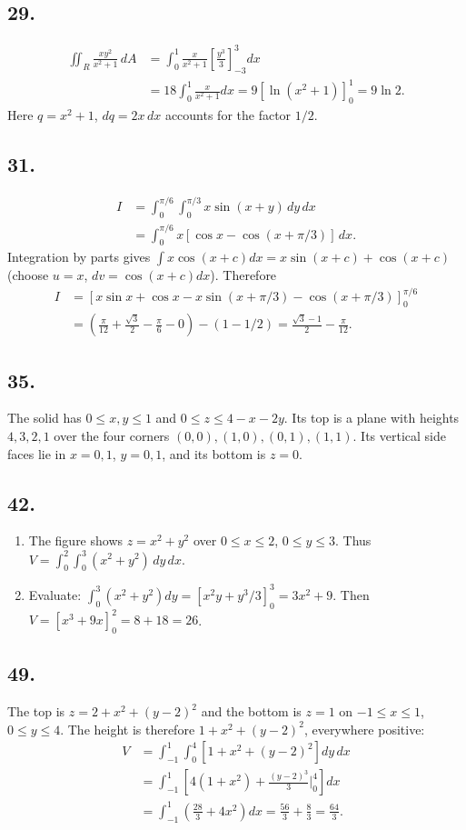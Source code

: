 \documentclass[11pt]{article}
\newcommand{\ex}[1]{\subsection*{#1.}}
\newcommand{\ans}[1]{\boxed{#1}}
\begin{document}
\ex{29}
\begin{align*}
\iint_R\frac{xy^2}{x^2+1}\,dA
&=\int_0^1\frac{x}{x^2+1}\left[\frac{y^3}{3}\right]_{-3}^3dx\\
&=18\int_0^1\frac{x}{x^2+1}dx
=9[\ln(x^2+1)]_0^1=\ans{9\ln2}.
\end{align*}
Here $q=x^2+1$, $dq=2x\,dx$ accounts for the factor $1/2$.
\ex{31}
\begin{align*}
I&=\int_0^{\pi/6}\int_0^{\pi/3}x\sin(x+y)\,dy\,dx\\
&=\int_0^{\pi/6}x[\cos x-\cos(x+\pi/3)]\,dx.
\end{align*}
Integration by parts gives $\int x\cos(x+c)dx=x\sin(x+c)+\cos(x+c)$ (choose $u=x$, $dv=\cos(x+c)dx$). Therefore
\begin{align*}
I&=[x\sin x+\cos x-x\sin(x+\pi/3)-\cos(x+\pi/3)]_0^{\pi/6}\\
&=\left(\frac\pi{12}+\frac{\sqrt3}{2}-\frac\pi6-0\right)-(1-1/2)
=\ans{\frac{\sqrt3-1}{2}-\frac\pi{12}}.
\end{align*}
\ex{35}
The solid has $0\le x,y\le1$ and $0\le z\le4-x-2y$. Its top is a plane with heights $4,3,2,1$ over the four corners $(0,0),(1,0),(0,1),(1,1)$. Its vertical side faces lie in $x=0,1$, $y=0,1$, and its bottom is $z=0$.
\begin{center}\end{center}
\ex{42}
\begin{enumerate}[label=(\alph*)]
\item The figure shows $z=x^2+y^2$ over $0\le x\le2$, $0\le y\le3$. Thus $\ans{V=\int_0^2\int_0^3(x^2+y^2)\,dy\,dx}$.
\item Evaluate: $\int_0^3(x^2+y^2)dy=[x^2y+y^3/3]_0^3=3x^2+9$. Then $V=[x^3+9x]_0^2=8+18=\ans{26}$.
\end{enumerate}
\ex{49}
The top is $z=2+x^2+(y-2)^2$ and the bottom is $z=1$ on $-1\le x\le1$, $0\le y\le4$. The height is therefore $1+x^2+(y-2)^2$, everywhere positive:
\begin{align*}
V&=\int_{-1}^1\int_0^4[1+x^2+(y-2)^2]dy\,dx\\
&=\int_{-1}^1\left[4(1+x^2)+\frac{(y-2)^3}{3}\bigg|_0^4\right]dx\\
&=\int_{-1}^1\left(\frac{28}3+4x^2\right)dx
=\frac{56}3+\frac83=\ans{\frac{64}3}.
\end{align*}
\end{document}
